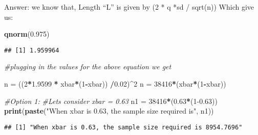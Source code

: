 \documentclass[
]{article}
\newenvironment{Shaded}{\begin{snugshade}}{\end{snugshade}}
\newcommand{\CommentTok}[1]{\textcolor[rgb]{0.56,0.35,0.01}{\textit{#1}}}
\newcommand{\DecValTok}[1]{\textcolor[rgb]{0.00,0.00,0.81}{#1}}
\newcommand{\FloatTok}[1]{\textcolor[rgb]{0.00,0.00,0.81}{#1}}
\newcommand{\FunctionTok}[1]{\textcolor[rgb]{0.13,0.29,0.53}{\textbf{#1}}}
\newcommand{\NormalTok}[1]{#1}
\newcommand{\OtherTok}[1]{\textcolor[rgb]{0.56,0.35,0.01}{#1}}
\newcommand{\SpecialCharTok}[1]{\textcolor[rgb]{0.81,0.36,0.00}{\textbf{#1}}}
\newcommand{\StringTok}[1]{\textcolor[rgb]{0.31,0.60,0.02}{#1}}
\begin{document}
Answer: we know that, Length ``L'' is given by (2 * q *sd / sqrt(n))
Which give us:

\begin{Shaded}
\begin{Highlighting}[]
\FunctionTok{qnorm}\NormalTok{(}\FloatTok{0.975}\NormalTok{)}
\end{Highlighting}
\end{Shaded}

\begin{verbatim}
## [1] 1.959964
\end{verbatim}

\begin{Shaded}
\begin{Highlighting}[]
\CommentTok{\#plugging in the values for the above equation we get}

\NormalTok{n }\OtherTok{=}\NormalTok{ ((}\DecValTok{2}\SpecialCharTok{*}\FloatTok{1.9599} \SpecialCharTok{*}\NormalTok{ xbar}\SpecialCharTok{*}\NormalTok{(}\DecValTok{1}\SpecialCharTok{{-}}\NormalTok{xbar)) }\SpecialCharTok{/}\FloatTok{0.02}\NormalTok{)}\SpecialCharTok{\^{}}\DecValTok{2}
\NormalTok{n }\OtherTok{=} \DecValTok{38416}\SpecialCharTok{*}\NormalTok{(xbar}\SpecialCharTok{*}\NormalTok{(}\DecValTok{1}\SpecialCharTok{{-}}\NormalTok{xbar))}

\CommentTok{\#Option 1:}
  \CommentTok{\#Lets consider xbar = 0.63}
\NormalTok{n1 }\OtherTok{=} \DecValTok{38416}\SpecialCharTok{*}\NormalTok{(}\FloatTok{0.63}\SpecialCharTok{*}\NormalTok{(}\DecValTok{1}\FloatTok{{-}0.63}\NormalTok{))}
\FunctionTok{print}\NormalTok{(}\FunctionTok{paste}\NormalTok{(}\StringTok{"When xbar is 0.63, the sample size required is"}\NormalTok{, n1))}
\end{Highlighting}
\end{Shaded}

\begin{verbatim}
## [1] "When xbar is 0.63, the sample size required is 8954.7696"
\end{verbatim}
\end{document}
